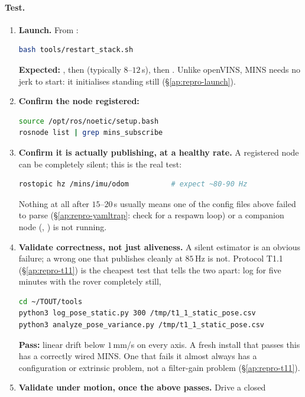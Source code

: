 \paragraph{Test.}
\begin{enumerate}[leftmargin=1.4em]
\item \textbf{Launch.} From :
\begin{lstlisting}[language=bash]
bash tools/restart_stack.sh
\end{lstlisting}
  \textbf{Expected:} , then
   (typically $8$--$12$\,s), then
  . Unlike openVINS, MINS needs no jerk to start: it
  initialises standing still (\S\ref{ap:repro-launch}).
\item \textbf{Confirm the node registered:}
\begin{lstlisting}[language=bash]
source /opt/ros/noetic/setup.bash
rosnode list | grep mins_subscribe
\end{lstlisting}
\item \textbf{Confirm it is actually publishing, at a healthy rate.} A
  registered node can be completely silent; this is the real test:
\begin{lstlisting}[language=bash]
rostopic hz /mins/imu/odom          # expect ~80-90 Hz
\end{lstlisting}
  Nothing at all after $15$--$20$\,s usually means one of the config files
  above failed to parse (\S\ref{ap:repro-yamltrap}: check
   for a respawn loop) or a companion node
  (, ) is not running.
\item \textbf{Validate correctness, not just aliveness.} A silent estimator
  is an obvious failure; a wrong one that publishes cleanly at $85$\,Hz is
  not. Protocol T1.1 (\S\ref{ap:repro-t11}) is the cheapest test that tells
  the two apart: log  for five minutes with the
  rover completely still,
\begin{lstlisting}[language=bash]
cd ~/TOUT/tools
python3 log_pose_static.py 300 /tmp/t1_1_static_pose.csv
python3 analyze_pose_variance.py /tmp/t1_1_static_pose.csv
\end{lstlisting}
  \textbf{Pass:} linear drift below $1$\,mm/s on every axis. A fresh install
  that passes this has a correctly wired MINS. One that fails it almost
  always has a configuration or extrinsic problem, not a filter-gain problem
  (\S\ref{ap:repro-t11}).
\item \textbf{Validate under motion, once the above passes.} Drive a closed

\end{enumerate}

